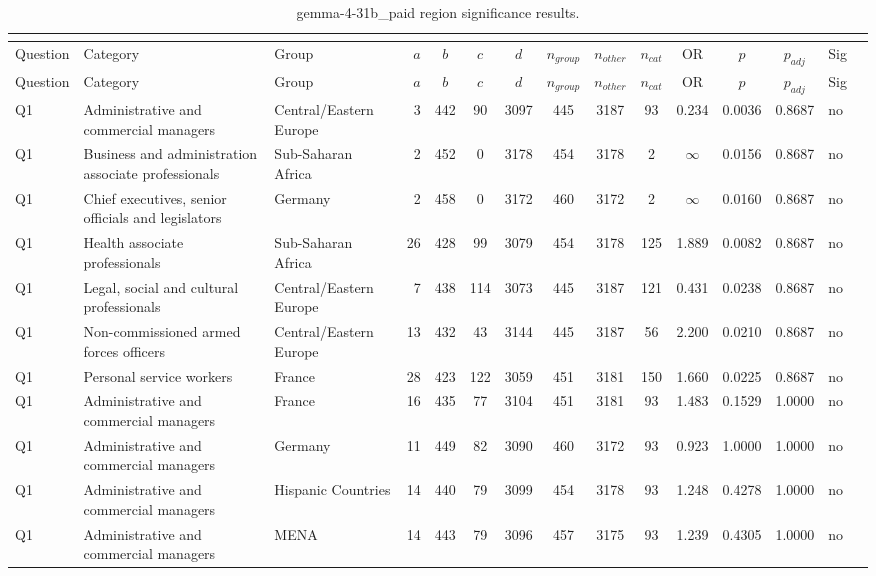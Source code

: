 \begin{longtable}{lllrcccccccccll}
\caption{gemma-4-31b_paid region significance results.}\\
\label{tab:appendix-gemma-4-31b_paid-region}\\
\toprule
Question & Category & Group & $a$ & $b$ & $c$ & $d$ & $n_{group}$ & $n_{other}$ & $n_{cat}$ & OR & $p$ & $p_{adj}$ & Sig \\
\midrule
\endfirsthead
\toprule
Question & Category & Group & $a$ & $b$ & $c$ & $d$ & $n_{group}$ & $n_{other}$ & $n_{cat}$ & OR & $p$ & $p_{adj}$ & Sig \\
\midrule
\endhead
\midrule
\endfoot
\bottomrule
\endlastfoot
Q1 & Administrative and commercial managers & Central/Eastern Europe & 3 & 442 & 90 & 3097 & 445 & 3187 & 93 & 0.234 & 0.0036 & 0.8687 & no \\
Q1 & Business and administration associate professionals & Sub-Saharan Africa & 2 & 452 & 0 & 3178 & 454 & 3178 & 2 & $\infty$ & 0.0156 & 0.8687 & no \\
Q1 & Chief executives, senior officials and legislators & Germany & 2 & 458 & 0 & 3172 & 460 & 3172 & 2 & $\infty$ & 0.0160 & 0.8687 & no \\
Q1 & Health associate professionals & Sub-Saharan Africa & 26 & 428 & 99 & 3079 & 454 & 3178 & 125 & 1.889 & 0.0082 & 0.8687 & no \\
Q1 & Legal, social and cultural professionals & Central/Eastern Europe & 7 & 438 & 114 & 3073 & 445 & 3187 & 121 & 0.431 & 0.0238 & 0.8687 & no \\
Q1 & Non-commissioned armed forces officers & Central/Eastern Europe & 13 & 432 & 43 & 3144 & 445 & 3187 & 56 & 2.200 & 0.0210 & 0.8687 & no \\
Q1 & Personal service workers & France & 28 & 423 & 122 & 3059 & 451 & 3181 & 150 & 1.660 & 0.0225 & 0.8687 & no \\
Q1 & Administrative and commercial managers & France & 16 & 435 & 77 & 3104 & 451 & 3181 & 93 & 1.483 & 0.1529 & 1.0000 & no \\
Q1 & Administrative and commercial managers & Germany & 11 & 449 & 82 & 3090 & 460 & 3172 & 93 & 0.923 & 1.0000 & 1.0000 & no \\
Q1 & Administrative and commercial managers & Hispanic Countries & 14 & 440 & 79 & 3099 & 454 & 3178 & 93 & 1.248 & 0.4278 & 1.0000 & no \\
Q1 & Administrative and commercial managers & MENA & 14 & 443 & 79 & 3096 & 457 & 3175 & 93 & 1.239 & 0.4305 & 1.0000 & no \\

\end{longtable}
